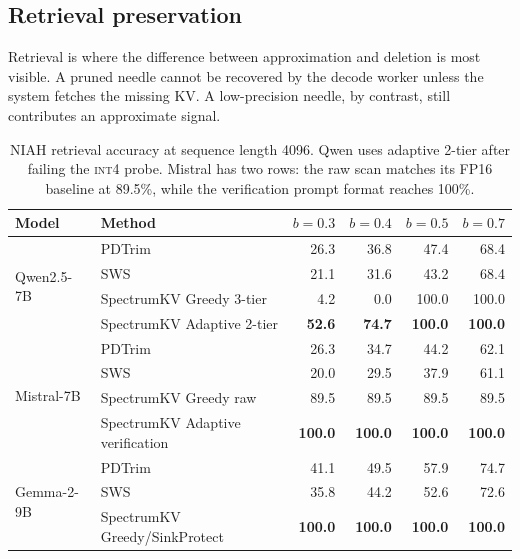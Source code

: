 \documentclass[11pt]{article}
\newcommand{\method}{SpectrumKV}
\newcommand{\niah}{NIAH}
\newcommand{\budget}{b}
\newcommand{\pct}{\%}
\newcommand{\intiv}{\textsc{int4}}
\theoremstyle{plain}
\theoremstyle{definition}
\begin{document}
\subsection{Retrieval preservation}
\label{sec:rq11}

Retrieval is where the difference between approximation and deletion is most visible.  A pruned needle cannot be recovered by the decode worker unless the system fetches the missing KV.  A low-precision needle, by contrast, still contributes an approximate signal.

\begin{table}[t]
\centering
\caption{\niah{} retrieval accuracy at sequence length 4096.  Qwen uses adaptive 2-tier after failing the \intiv{} probe.  Mistral has two rows: the raw scan matches its FP16 baseline at 89.5\pct{}, while the verification prompt format reaches 100\pct{}.}
\label{tab:niah}
\small
\begin{tabular}{llrrrr}
\toprule
Model & Method & $\budget=0.3$ & $\budget=0.4$ & $\budget=0.5$ & $\budget=0.7$ \\
\midrule
\multirow{4}{*}{Qwen2.5-7B}
  & PDTrim & 26.3 & 36.8 & 47.4 & 68.4 \\
  & SWS & 21.1 & 31.6 & 43.2 & 68.4 \\
  & \method{} Greedy 3-tier & 4.2 & 0.0 & 100.0 & 100.0 \\
  & \method{} Adaptive 2-tier & \textbf{52.6} & \textbf{74.7} & \textbf{100.0} & \textbf{100.0} \\
\midrule
\multirow{4}{*}{Mistral-7B}
  & PDTrim & 26.3 & 34.7 & 44.2 & 62.1 \\
  & SWS & 20.0 & 29.5 & 37.9 & 61.1 \\
  & \method{} Greedy raw & 89.5 & 89.5 & 89.5 & 89.5 \\
  & \method{} Adaptive verification & \textbf{100.0} & \textbf{100.0} & \textbf{100.0} & \textbf{100.0} \\
\midrule
\multirow{3}{*}{Gemma-2-9B}
  & PDTrim & 41.1 & 49.5 & 57.9 & 74.7 \\
  & SWS & 35.8 & 44.2 & 52.6 & 72.6 \\
  & \method{} Greedy/SinkProtect & \textbf{100.0} & \textbf{100.0} & \textbf{100.0} & \textbf{100.0} \\
\bottomrule
\end{tabular}
\end{table}
\end{document}
